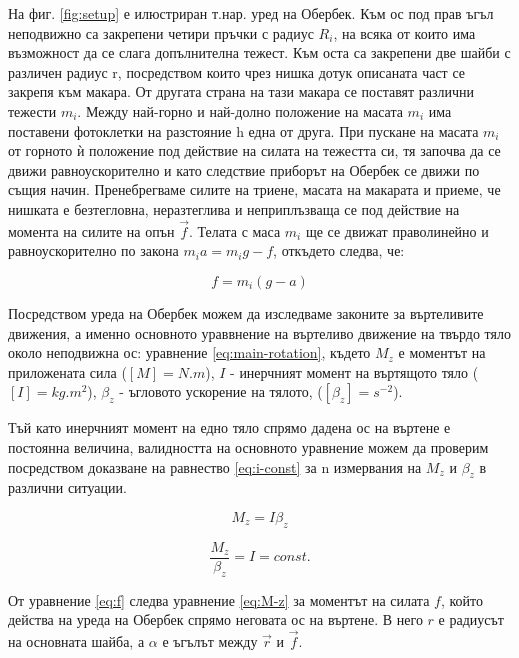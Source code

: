 \documentclass[12pt]{article}
\begin{document}
На фиг. \ref{fig:setup} е илюстриран т.нар. уред на Обербек. Към ос под прав ъгъл неподвижно са закрепени четири пръчки с радиус $R_i$, на всяка от които има възможност да се слага допълнителна тежест. Към оста са закрепени две шайби с различен радиус r, посредством които чрез нишка дотук описаната част се закрепя към макара. От другата страна на тази макара се поставят различни тежести $m_i$. Между най-горно и най-долно положение на масата $m_i$ има поставени фотоклетки на разстояние h една от друга. При пускане на масата $m_i$ от горното ѝ положение под действие на силата на тежестта си, тя започва да се движи равноускорително и като следствие приборът на Обербек се движи по същия начин. Пренебрегваме силите на триене, масата на макарата и приеме, че нишката е безтегловна, неразтеглива и неприплъзваща се под действие на момента на силите на опън $\vec{f}$. Телата с маса $m_i$ ще се движат праволинейно и равноускорително по закона $m_ia = m_ig - f$, откъдето следва, че:

\begin{equation}\label{eq:f}
f = m_i(g-a)    
\end{equation}

Посредством уреда на Обербек можем да изследваме законите за въртеливите движения, а именно основното ураввнение на въртеливо движение на твърдо тяло около неподвижна ос: уравнение \ref{eq:main-rotation}, където $M_z$ е моментът на приложената сила ($[M] = N.m$), $I$ - инерчният момент на въртящото тяло ($[I] = kg.m^2$), $\beta_z$ - ъгловото ускорение на тялото, ($[\beta_z] = s^{-2}$).

Тъй като инерчният момент на едно тяло спрямо дадена ос на въртене е постоянна величина, валидността на основното уравнение можем да проверим посредством доказване на равнество \ref{eq:i-const} за n измервания на $M_z$ и $\beta_z$ в различни ситуации. 

\begin{equation}\label{eq:main-rotation}
    M_z = I \beta_z
\end{equation}

\begin{equation}\label{eq:i-const}
    \frac{M_z}{\beta_z} = I = const.
\end{equation}

От уравнение \ref{eq:f} следва уравнение \ref{eq:M-z} за моментът на силата $f$, който действа на уреда на Обербек спрямо неговата ос на въртене. В него $r$ е радиусът на основната шайба, а $\alpha$ е ъгълът между $\vec{r}$ и $\vec{f}$. 
\end{document}
